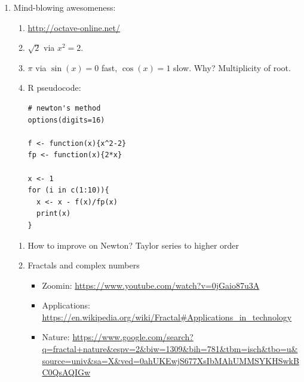 \documentclass{article}
\begin{document}
\begin{enumerate}
\item Mind-blowing awesomeness:
\begin{enumerate}
\item \url{http://octave-online.net/}
\item $\sqrt{2}$ via $x^2=2$.
\item $\pi$ via $\sin(x)=0$ fast, $\cos(x)=1$ slow. Why? Multiplicity of root.
\item R pseudocode:
\begin{verbatim}
# newton's method
options(digits=16)

f <- function(x){x^2-2}
fp <- function(x){2*x}

x <- 1
for (i in c(1:10)){
  x <- x - f(x)/fp(x)
  print(x)
}
\end{verbatim}
\end{enumerate}

\begin{enumerate}
\item How to improve on Newton? Taylor series to higher order
\item Fractals and complex numbers
\begin{itemize}
\item Zoomin: \url{https://www.youtube.com/watch?v=0jGaio87u3A}
\item Applications: \url{https://en.wikipedia.org/wiki/Fractal#Applications_in_technology}
\item Nature: \url{https://www.google.com/search?q=fractal+nature&espv=2&biw=1309&bih=781&tbm=isch&tbo=u&source=univ&sa=X&ved=0ahUKEwjS677XsIbMAhUMMSYKHSwkBC0QsAQIGw}
\end{itemize}
\end{enumerate}
\end{enumerate}


\end{document}
